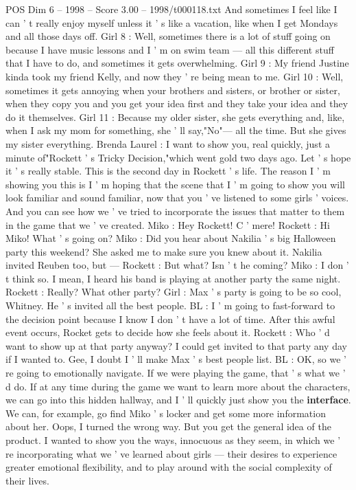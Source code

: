 \begin{textsample}{POS Dim 6 – 1998 – Score 3.00 – 1998/t000118.txt}
And sometimes I feel like I can ' t really enjoy myself unless it ' s like a vacation, like when I get Mondays and all those days off.
Girl 8 : Well, sometimes there is a lot of stuff going on because I have music lessons and I ' m on swim team — all this different stuff that I have to do, and sometimes it gets overwhelming.
Girl 9 : My friend Justine kinda took my friend Kelly, and now they ' re being mean to me.
Girl 10 : Well, sometimes it gets annoying when your brothers and sisters, or brother or sister, when they copy you and you get your idea first and they take your idea and they do it themselves.
Girl 11 : Because my older sister, she gets everything and, like, when I ask my mom for something, she ' ll say,"No"— all the time.
But she gives my sister everything.
Brenda Laurel : I want to show you, real quickly, just a minute of"Rockett ' s Tricky Decision,"which went gold two days ago.
Let ' s hope it ' s really stable.
This is the second day in Rockett ' s life.
The reason I ' m showing you this is I ' m hoping that the scene that I ' m going to show you will look familiar and sound familiar, now that you ' ve listened to some girls ' voices.
And you can see how we ' ve tried to incorporate the issues that matter to them in the game that we ' ve created.
Miko : Hey Rockett!
C ' mere!
Rockett : Hi Miko!
What ' s going on?
Miko : Did you hear about Nakilia ' s big Halloween party this weekend?
She asked me to make sure you knew about it.
Nakilia invited Reuben too, but — Rockett : But what?
Isn ' t he coming?
Miko : I don ' t think so.
I mean, I heard his band is playing at another party the same night.
Rockett : Really?
What other party?
Girl : Max ' s party is going to be so cool, Whitney.
He ' s invited all the best people.
BL : I ' m going to fast-forward to the decision point because I know I don ' t have a lot of time.
After this awful event occurs, Rocket gets to decide how she feels about it.
Rockett : Who ' d want to show up at that party anyway?
I could get invited to that party any day if I wanted to.
Gee, I doubt I ' ll make Max ' s best people list.
BL : OK, so we ' re going to emotionally navigate.
If we were playing the game, that ' s what we ' d do.
If at any time during the game we want to learn more about the characters, we can go into this hidden hallway, and I ' ll quickly just show you the \textbf{interface}.
We can, for example, go find Miko ' s locker and get some more information about her.
Oops, I turned the wrong way.
But you get the general idea of the product.
I wanted to show you the ways, innocuous as they seem, in which we ' re incorporating what we ' ve learned about girls — their desires to experience greater emotional flexibility, and to play around with the social complexity of their lives.

\end{textsample}
